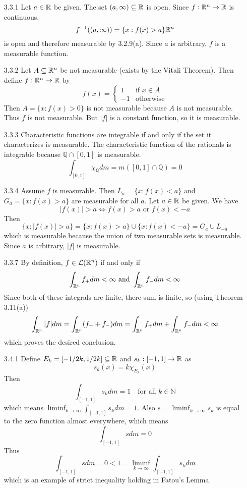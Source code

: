 \documentclass[../../Solutions.tex]{subfiles}
\begin{document}
\begin{itemize}
	\item [3.3.1] Let $a \in \mathbb{R}$ be given.
		The set $(a,\infty)\subseteq\mathbb{R}$ is open.
		Since $f:\mathbb{R}^n\to\mathbb{R}$ is continuous,
		$$ f^{-1}((a,\infty)) = \{x : f(x) > a \} \mathbb{R}^n $$
		is open and therefore measurable by 3.2.9(a).
		Since $a$ is arbitrary, $f$ is a measurable function.
	
	\item [3.3.2] Let $A \subseteq \mathbb{R}^n$ be not measurable (exists by the Vitali Theorem).
		Then define $f:\mathbb{R}^n\to\mathbb{R}$ by
		\begin{equation*}
			f(x) = \begin{cases}
				1 & \text{if } x \in A \\
				-1 & \text{otherwise}
			\end{cases}
		\end{equation*}
		Then $A = \{ x : f(x) > 0 \}$ is not measurable because $A$ is not measurable.
		Thus $f$ is not measurable.
		But $|f|$ is a constant function, so it is measurable.
	
	\item [3.3.3] Characteristic functions are integrable if and only if the set it characterizes is measurable.
		The characteristic function of the rationals is integrable because $\mathbb{Q}\cap[0,1]$ is measurable.
		$$ \int_{[0,1]} \chi_{\mathbb{Q}} dm = m([0,1]\cap\mathbb{Q}) = 0 $$
	
	\item [3.3.4] Assume $f$ is measurable.
		Then $L_a = \{x : f(x) < a \}$ and $G_a = \{x : f(x) > a \}$ are measurable for all $a$.
		Let $a \in \mathbb{R}$ be given. We have
		$$ |f(x)| > a \iff f(x) > a \text{  or  } f(x) < -a $$
		Then
		$$ \{x : |f(x)|>a\} = \{x : f(x) > a \}\cup\{x : f(x) < -a\} = G_a\cup L_{-a} $$
		which is measurable because the union of two measurable sets is measurable.
		Since $a$ is arbitrary, $|f|$ is measurable.
		
	\item [3.3.7] By definition, $f \in \mathcal{L}(\mathbb{R}^n)$ if and only if
		$$ \int_{\mathbb{R}^n} f_+ dm < \infty \text{  and  } \int_{\mathbb{R}^n} f_- dm < \infty $$
		Since both of these integrals are finite, there sum is finite, so (using Theorem 3.11(a))
		$$ \int_{\mathbb{R}^n} |f| dm = \int_{\mathbb{R}^n} (f_+ + f_-) dm = \int_{\mathbb{R}^n} f_+ dm + \int_{\mathbb{R}^n} f_- dm < \infty $$
		which proves the desired conclusion.
	
	\item [3.4.1] Define $E_k = [-1/2k,1/2k] \subseteq \mathbb{R}$ and $s_k:[-1,1]\to\mathbb{R}$ as
		$$ s_k(x) = k\chi_{E_k}(x) $$
		Then 
		$$ \int_{[-1,1]} s_k dm = 1 \quad\text{for all } k \in \mathbb{N} $$
		which means $\liminf_{k\to\infty} \int_{[-1,1]} s_k dm = 1$.
		Also $s = \liminf_{k\to\infty} s_k$ is equal to the zero function almost everywhere, which means
		$$ \int_{[-1,1]} s dm = 0 $$
		Thus
		$$ \int_{[-1,1]} s dm = 0 < 1 = \liminf_{k\to\infty} \int_{[-1,1]} s_k dm $$
		which is an example of strict inequality holding in Fatou's Lemma.
	

\end{itemize}
\end{document}

